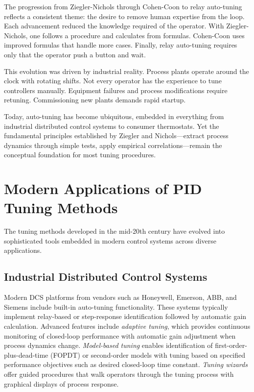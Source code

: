 The progression from Ziegler-Nichols through Cohen-Coon to relay auto-tuning reflects a consistent theme: the desire to remove human expertise from the loop. Each advancement reduced the knowledge required of the operator. With Ziegler-Nichols, one follows a procedure and calculates from formulas. Cohen-Coon uses improved formulas that handle more cases. Finally, relay auto-tuning requires only that the operator push a button and wait.

This evolution was driven by industrial reality. Process plants operate around the clock with rotating shifts. Not every operator has the experience to tune controllers manually. Equipment failures and process modifications require retuning. Commissioning new plants demands rapid startup.

Today, auto-tuning has become ubiquitous, embedded in everything from industrial distributed control systems to consumer thermostats. Yet the fundamental principles established by Ziegler and Nichols---extract process dynamics through simple tests, apply empirical correlations---remain the conceptual foundation for most tuning procedures.


\section{Modern Applications of PID Tuning Methods}
\label{sec:pid_tuning_modern}

The tuning methods developed in the mid-20th century have evolved into sophisticated tools embedded in modern control systems across diverse applications.

\subsection{Industrial Distributed Control Systems}

Modern DCS platforms from vendors such as Honeywell, Emerson, ABB, and Siemens include built-in auto-tuning functionality. These systems typically implement relay-based or step-response identification followed by automatic gain calculation. Advanced features include \textit{adaptive tuning}, which provides continuous monitoring of closed-loop performance with automatic gain adjustment when process dynamics change. \textit{Model-based tuning} enables identification of first-order-plus-dead-time (FOPDT) or second-order models with tuning based on specified performance objectives such as desired closed-loop time constant. \textit{Tuning wizards} offer guided procedures that walk operators through the tuning process with graphical displays of process response.

